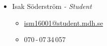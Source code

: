 \begin{itemize}
        \item Isak Söderström \textit{- Student}
            \begin{itemize}
                \item \href{mailto:ism16001@student.mdh.se}{ism16001@student.mdh.se}
                \item 070\,-\,07\,34\,057
            \end{itemize}
\end{itemize}






